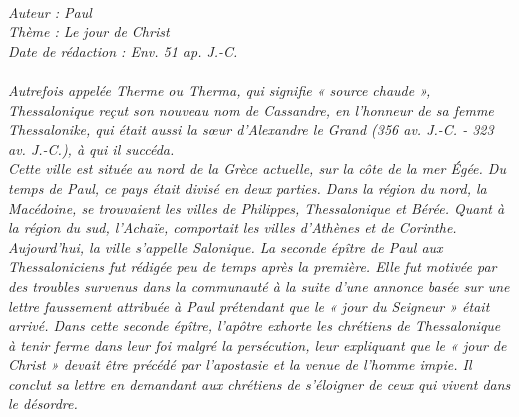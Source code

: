 \BFont
\noindent\hrulefill
{\footnotesize
\textit{
\bigskip
{\centering{}
\\Auteur : Paul
\\Thème : Le jour de Christ
\\Date de rédaction : Env. 51 ap. J.-C.\\}
}
\textit{
\\Autrefois appelée Therme ou Therma, qui signifie « source chaude », Thessalonique reçut son nouveau nom de Cassandre, en l'honneur de sa femme Thessalonike, qui était aussi la sœur d'Alexandre le Grand (356 av. J.-C. - 323 av. J.-C.), à qui il succéda.
\\Cette ville est située au nord de la Grèce actuelle, sur la côte de la mer Égée. Du temps de Paul, ce pays était divisé en deux parties. Dans la région du nord, la Macédoine, se trouvaient les villes de Philippes, Thessalonique et Bérée. Quant à la région du sud, l'Achaïe, comportait les villes d'Athènes et de Corinthe. Aujourd'hui, la ville s'appelle Salonique. La seconde épître de Paul aux Thessaloniciens fut rédigée peu de temps après la première. Elle fut motivée par des troubles survenus dans la communauté à la suite d'une annonce basée sur une lettre faussement attribuée à Paul prétendant que le « jour du Seigneur » était arrivé. Dans cette seconde épître, l'apôtre exhorte les chrétiens de Thessalonique à tenir ferme dans leur foi malgré la persécution, leur expliquant que le « jour de Christ » devait être précédé par l'apostasie et la venue de l'homme impie. Il conclut sa lettre en demandant aux chrétiens de s'éloigner de ceux qui vivent dans le désordre.\bigskip
}
}
\par\nobreak\noindent\hrulefill
